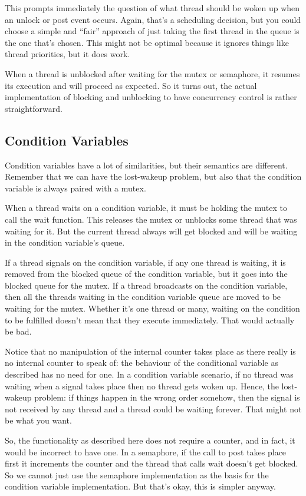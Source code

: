 This prompts immediately the question of what thread should be woken up when an unlock or post event occurs. Again, that's a scheduling decision, but you could choose a simple and ``fair'' approach of just taking the first thread in the queue is the one that's chosen. This might not be optimal because it ignores things like thread priorities, but it does work. 

When a thread is unblocked after waiting for the mutex or semaphore, it resumes its execution and will proceed as expected. So it turns out, the actual implementation of blocking and unblocking to have concurrency control is rather straightforward. 

\subsection*{Condition Variables}
Condition variables have a lot of similarities, but their semantics are different. Remember that we can have the lost-wakeup problem, but also that the condition variable is always paired with a mutex.

When a thread waits on a condition variable, it must be holding the mutex to call the wait function. This releases the mutex or unblocks some thread that was waiting for it. But the current thread always will get blocked and will be waiting in the condition variable's queue. 

If a thread signals on the condition variable, if any one thread is waiting, it is removed from the blocked queue of the condition variable, but it goes into the blocked queue for the mutex. If a thread broadcasts on the condition variable, then all the threads waiting in the condition variable queue are moved to be waiting for the mutex. Whether it's one thread or many, waiting on the condition to be fulfilled doesn't mean that they execute immediately. That would actually be bad.

Notice that no manipulation of the internal counter takes place as there really is no internal counter to speak of: the behaviour of the conditional variable as described has no need for one. In a condition variable scenario, if no thread was waiting when a signal takes place then no thread gets woken up. Hence, the lost-wakeup problem: if things happen in the wrong order somehow, then the signal is not received by any thread and a thread could be waiting forever. That might not be what you want. 

So, the functionality as described here does not require a counter, and in fact, it would be incorrect to have one. In a semaphore, if the call to post takes place first it increments the counter and the thread that calls wait doesn't get blocked. So we cannot just use the semaphore implementation as the basis for the condition variable implementation. But that's okay, this is simpler anyway.



